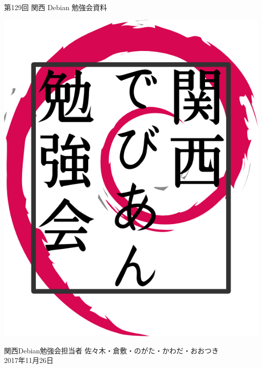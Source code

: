 \documentclass[mingoth,a4paper]{jsarticle}
\newcommand{\debmtgyear}{2017}
\newcommand{\debmtgdate}{26}
\newcommand{\debmtgmonth}{11}
\newcommand{\debmtgnumber}{129}
\begin{document}
\begin{titlepage}


  第\debmtgnumber{}回 関西 Debian 勉強会資料

  \vspace{2cm}

  \begin{center}
    \includegraphics{image200802/kansaidebianlogo.png}
  \end{center}

  \begin{flushright}
    \hfill{}関西Debian勉強会担当者 佐々木・倉敷・のがた・かわだ・おおつき \\
    \hfill{}\debmtgyear{}年\debmtgmonth{}月\debmtgdate{}日
  \end{flushright}

  \thispagestyle{empty}
\end{titlepage}

\end{document}
